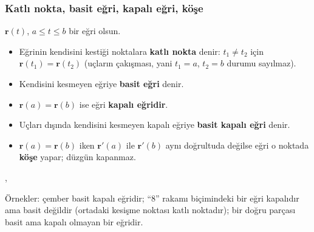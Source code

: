 \subsubsection{Katlı nokta, basit eğri, kapalı eğri, köşe}

\begin{tanim}
$\mathbf r(t)$, $a\le t\le b$ bir eğri olsun.
\begin{itemize}
\item Eğrinin kendisini kestiği noktalara \textbf{katlı nokta} denir: $t_1\neq t_2$ için $\mathbf r(t_1)=\mathbf r(t_2)$
(uçların çakışması, yani $t_1=a$, $t_2=b$ durumu sayılmaz).
\item Kendisini kesmeyen eğriye \textbf{basit eğri} denir.
\item $\mathbf r(a)=\mathbf r(b)$ ise eğri \textbf{kapalı eğridir}.
\item Uçları dışında kendisini kesmeyen kapalı eğriye \textbf{basit kapalı eğri} denir.
\item $\mathbf r(a)=\mathbf r(b)$ iken $\mathbf r'(a)$ ile $\mathbf r'(b)$ aynı doğrultuda değilse eğri o noktada \textbf{köşe}
yapar; düzgün kapanmaz.
\end{itemize}
, 
\end{tanim}

Örnekler: çember basit kapalı eğridir; ``8'' rakamı biçimindeki bir eğri kapalıdır ama basit değildir (ortadaki kesişme
noktası katlı noktadır); bir doğru parçası basit ama kapalı olmayan bir eğridir.

